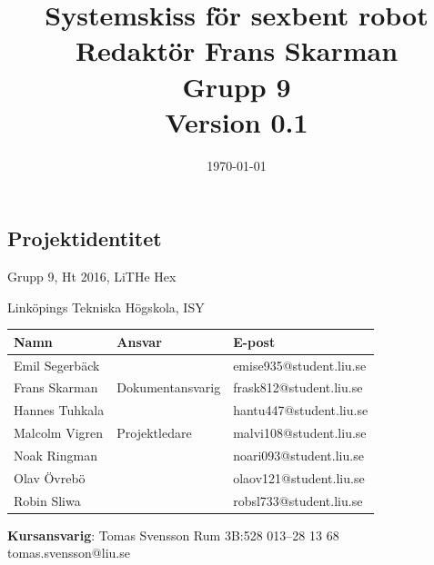 \documentclass[a4paper,titlepage,12pt]{article}
\begin{document}
    \title{\LARGE
        \textbf{Systemskiss för sexbent robot} \\
        \vspace*{0.5\baselineskip}
        \large
        Redaktör Frans Skarman \\
        Grupp 9 \\
        \small
        \vspace*{0.5\baselineskip}
        Version 0.1}

    \date{\today}

	\maketitle
	
	\newpage
	
	\begin{center}


		\section*{Projektidentitet}
		Grupp 9, Ht 2016, LiTHe Hex

		Linköpings Tekniska Högskola, ISY

		\renewcommand*{\arraystretch}{1.4}
		\begin{longtable}[c]{ l l l }
			\textbf{Namn} & \textbf{Ansvar} & \textbf{E-post} \\ \midrule
			Emil Segerbäck & & emise935@student.liu.se \\ \midrule
			Frans Skarman & Dokumentansvarig & frask812@student.liu.se \\ \midrule
			Hannes Tuhkala & & hantu447@student.liu.se \\ \midrule
			Malcolm Vigren & Projektledare & malvi108@student.liu.se \\ \midrule
			Noak Ringman &  & noari093@student.liu.se \\ \midrule
			Olav Övrebö &  & olaov121@student.liu.se \\ \midrule
			Robin Sliwa &  & robsl733@student.liu.se \\
		\end{longtable}

		\centering
		\textbf{Kursansvarig}: Tomas Svensson Rum 3B:528 013--28 13 68 tomas.svensson@liu.se


\end{center}
\end{document}
